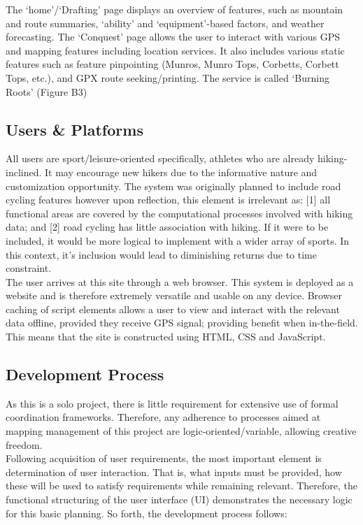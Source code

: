 \documentclass[11pt, english]{article}
\begin{document}
	The `home'/`Drafting' page displays an overview of features, such as mountain and route summaries, `ability' and `equipment'-based factors, and weather forecasting. The `Conquest' page allows the user to interact with various GPS and mapping features including location services. It also includes various static features such as feature pinpointing (Munros, Munro Tops, Corbetts, Corbett Tops, etc.), and GPX route seeking/printing. The service is called `Burning Roots' (Figure B3)\\

	\subsection{Users \& Platforms}

	All users are sport/leisure-oriented specifically, athletes who are already hiking-inclined. It may encourage new hikers due to the informative nature and customization opportunity. The system was originally planned to include road cycling features however upon reflection, this element is irrelevant as: [1] all functional areas are covered by the computational processes involved with hiking data; and [2] road cycling has little association with hiking. If it were to be included, it would be more logical to implement with a wider array of sports. In this context, it's inclusion would lead to diminishing returns due to time constraint.\\

	The user arrives at this site through a web browser. This system is deployed as a website and is therefore extremely versatile and usable on any device. Browser caching of script elements allows a user to view and interact with the relevant data offline, provided they receive GPS signal; providing benefit when in-the-field. This means that the site is constructed using HTML, CSS and JavaScript.

	\subsection{Development Process}

	As this is a solo project, there is little requirement for extensive use of formal coordination frameworks. Therefore, any adherence to processes aimed at mapping management of this project are logic-oriented/variable, allowing creative freedom.\\

	Following acquisition of user requirements, the most important element is determination of user interaction. That is, what inputs must be provided, how these will be used to satisfy requirements while remaining relevant. Therefore, the functional structuring of the user interface (UI) demonstrates the necessary logic for this basic planning. So forth, the development process follows:
\end{document}
